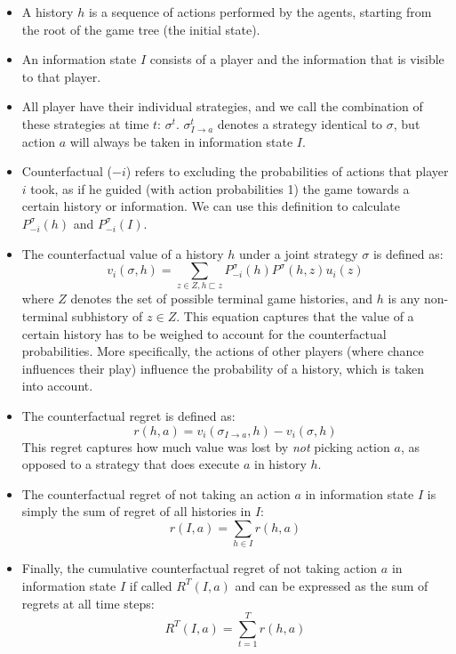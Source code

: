 \documentclass[10pt,a4paper]{article}
\begin{document}
\begin{itemize}
\item{A history $h$ is a sequence of actions performed by the agents, starting from the root of the game tree (the initial state). }
\item{An information state $I$ consists of a player and the information that is visible to that player.}
\item{All player have their individual strategies, and we call the combination of these strategies at time $t$: $\sigma^t$. $\sigma^t_{I \rightarrow a}$ denotes a strategy identical to $\sigma$, but action $a$ will always be taken in information state $I$.}
\item{Counterfactual ($-i$) refers to excluding the probabilities of actions that player $i$ took, as if he guided (with action probabilities 1) the game towards a certain history or information. We can use this definition to calculate $P^{\sigma}_{-i}(h)$ and $P^{\sigma}_{-i}(I)$.}
\item{The counterfactual value of a history $h$ under a joint strategy $\sigma$ is defined as:
\begin{equation}
v_{i}(\sigma,h) = \sum_{z \in Z, h \sqsubset z }{P^{\sigma}_{-i}(h)P^{\sigma}(h,z)u_i(z)}
\end{equation}
where $Z$ denotes the set of possible terminal game histories, and $h$ is any non-terminal subhistory of $z \in Z$. This equation captures that the value of a certain history has to be weighed to account for the counterfactual probabilities. More specifically, the actions of other players (where chance influences their play) influence the probability of a history, which is taken into account.}
\item{The counterfactual regret is defined as:
\begin{equation}
r(h,a) = v_{i}(\sigma_{I \rightarrow a},h) - v_{i}(\sigma,h)
\end{equation}
This regret captures how much value was lost by \textit{not} picking action $a$, as opposed to a strategy that does execute $a$ in history $h$.}
\item{The counterfactual regret of not taking an action $a$ in information state $I$ is simply the sum of regret of all histories in $I$:
\begin{equation}
r(I,a) = \sum_{h \in I}{r(h,a)}
\end{equation}}
\item{Finally, the cumulative counterfactual regret of not taking action $a$ in information state $I$ if called $R^T(I,a)$ and can be expressed as the sum of regrets at all time steps:
\begin{equation}
R^T(I,a) = \sum_{t=1}^{T}{r(h,a)}
\end{equation}}
\end{itemize}
\end{document}
